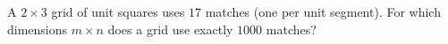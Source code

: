 A $2\times3$ grid of unit squares uses $17$ matches (one per unit segment). For which dimensions $m\times n$ does a grid use exactly $1000$ matches?
